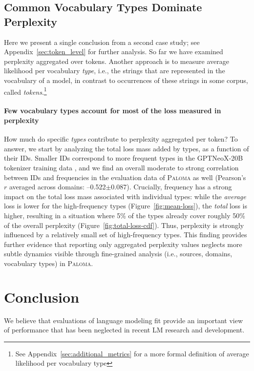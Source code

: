 \subsection{Common Vocabulary Types Dominate Perplexity}
\label{sec:common_types_body}
Here we present a single conclusion from a second case study; see Appendix~\ref{sec:token_level} for further analysis. So far we have examined perplexity aggregated over tokens. Another approach is to measure average likelihood per vocabulary \textit{type}, i.e., the strings that are represented in the vocabulary of a model, in contrast to occurrences of these strings in some corpus, called \textit{tokens}.\footnote{See Appendix~\ref{sec:additional_metrics} for a more formal definition of average likelihood per vocabulary type}

\paragraph{Few vocabulary types account for most of the loss measured in perplexity} How much do specific \emph{types} contribute to perplexity aggregated per token? To answer, we start by analyzing the total loss mass added by types, as a function of their IDs. Smaller IDs correspond to more frequent types in the GPTNeoX-20B tokenizer training data \citep{sennrich-etal-2016-neural, gpt-neo}, and we find an overall moderate to strong correlation between IDs and frequencies in the evaluation data of \textsc{Paloma} as well (Pearson's $r$ averaged across domains: \mbox{--0.522}$\pm$\mbox{0.087}). Crucially, frequency has a strong impact on the total loss mass associated with individual types: while the \emph{average} loss is lower for the high-frequency types (Figure~\ref{fig:mean-loss}), the \emph{total} loss is higher, resulting in a situation where 5\% of the types already cover roughly 50\% of the overall perplexity (Figure~\ref{fig:total-loss-cdf}). Thus, perplexity is strongly influenced by a relatively small set of high-frequency types. This finding provides further evidence that reporting only aggregated perplexity values neglects more subtle dynamics visible through fine-grained analysis (i.e., sources, domains, vocabulary types) in \textsc{Paloma}.

\section{Conclusion}
We believe that evaluations of language modeling fit provide an important view of performance that has been neglected in recent LM research and development.

